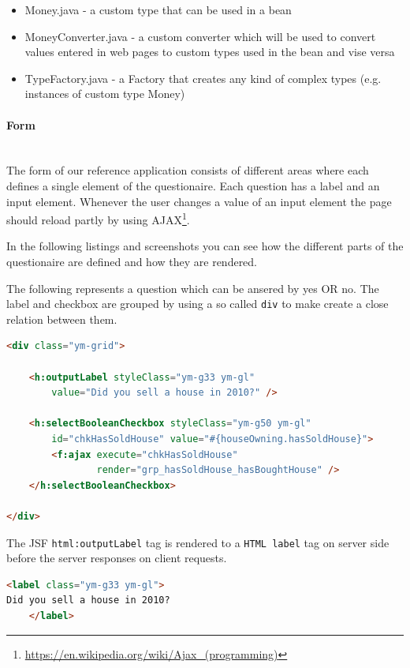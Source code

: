 \begin{itemize}
\item Money.java - a custom type that can be used in a bean
\item MoneyConverter.java - a custom converter which will be used to convert
values entered in web pages to custom types used in the bean and vise versa
\item TypeFactory.java - a Factory that creates any kind of complex types (e.g.
instances of custom type Money)
\end{itemize} 


\paragraph{Form} $\;$ \\
The form of our reference application consists of different areas where each
defines a single element of the questionaire. Each question has a label and an input element. Whenever the user
changes a value of an input element the page should reload partly by using
AJAX\footnote{\url{https://en.wikipedia.org/wiki/Ajax\_(programming)}}.

In the following listings and screenshots you can see how the different parts
of the questionaire are defined and how they are rendered. 

The following represents a question which can be ansered by yes OR no. The
label and checkbox are grouped by using a so called \texttt{div} to make create a close relation
between them.

\begin{lstlisting}[language=HTML]
<div class="ym-grid">

	<h:outputLabel styleClass="ym-g33 ym-gl"
		value="Did you sell a house in 2010?" />

	<h:selectBooleanCheckbox styleClass="ym-g50 ym-gl"
		id="chkHasSoldHouse" value="#{houseOwning.hasSoldHouse}">
		<f:ajax execute="chkHasSoldHouse"
				render="grp_hasSoldHouse_hasBoughtHouse" />
	</h:selectBooleanCheckbox>

</div>
\end{lstlisting}

The JSF \texttt{html:outputLabel} tag is rendered to a \texttt{HTML
label} tag on server side before the server responses on client requests. 

\begin{lstlisting}[language=HTML]
<label class="ym-g33 ym-gl">
Did you sell a house in 2010?
    </label>
\end{lstlisting}

